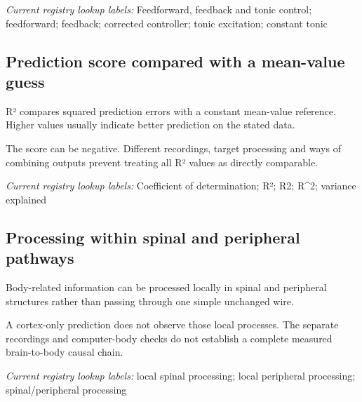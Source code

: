 \noindent\textit{Current registry lookup labels:} Feedforward, feedback and tonic control; feedforward; feedback; corrected controller; tonic excitation; constant tonic\par

\begin{samepage}
\subsection*{Prediction score compared with a mean-value guess}
\noindent R² compares squared prediction errors with a constant mean-value reference. Higher values usually indicate better prediction on the stated data.\par
\end{samepage}
\begin{samepage}
\noindent The score can be negative. Different recordings, target processing and ways of combining outputs prevent treating all R² values as directly comparable.\par\nopagebreak[4]

\end{samepage}


\noindent\textit{Current registry lookup labels:} Coefficient of determination; R²; R2; R\textasciicircum{}2; variance explained\par

\begin{samepage}
\subsection*{Processing within spinal and peripheral pathways}
\noindent Body-related information can be processed locally in spinal and peripheral structures rather than passing through one simple unchanged wire.\par
\end{samepage}
\begin{samepage}
\noindent A cortex-only prediction does not observe those local processes. The separate recordings and computer-body checks do not establish a complete measured brain-to-body causal chain.\par\nopagebreak[4]

\end{samepage}


\noindent\textit{Current registry lookup labels:} local spinal processing; local peripheral processing; spinal/peripheral processing\par

